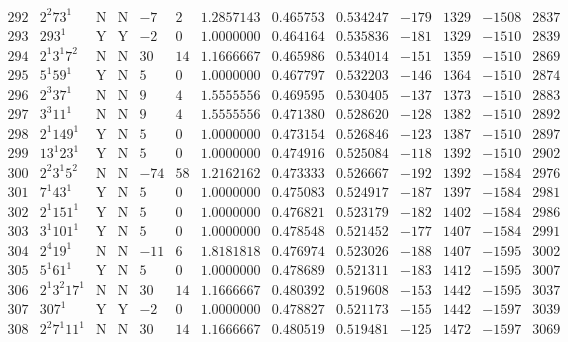 \documentclass[11pt,reqno,a4letter]{article}
\numberwithin{equation}{section}
\numberwithin{figure}{section}
\numberwithin{table}{section}
\theoremstyle{plain}
\numberwithin{theorem}{section}
\theoremstyle{definition}
\begin{document}
\begin{table}[ht]
\begin{equation*}
{\begin{array}{cc|cc|ccc|cc|cccc}
 292 & 2^2 73^1 & \text{N} & \text{N} & -7 & 2 & 1.2857143 & 0.465753 & 0.534247 & -179 & 1329 & -1508 & 2837 \\
 293 & 293^1 & \text{Y} & \text{Y} & -2 & 0 & 1.0000000 & 0.464164 & 0.535836 & -181 & 1329 & -1510 & 2839 \\
 294 & 2^1 3^1 7^2 & \text{N} & \text{N} & 30 & 14 & 1.1666667 & 0.465986 & 0.534014 & -151 & 1359 & -1510 & 2869 \\
 295 & 5^1 59^1 & \text{Y} & \text{N} & 5 & 0 & 1.0000000 & 0.467797 & 0.532203 & -146 & 1364 & -1510 & 2874 \\
 296 & 2^3 37^1 & \text{N} & \text{N} & 9 & 4 & 1.5555556 & 0.469595 & 0.530405 & -137 & 1373 & -1510 & 2883 \\
 297 & 3^3 11^1 & \text{N} & \text{N} & 9 & 4 & 1.5555556 & 0.471380 & 0.528620 & -128 & 1382 & -1510 & 2892 \\
 298 & 2^1 149^1 & \text{Y} & \text{N} & 5 & 0 & 1.0000000 & 0.473154 & 0.526846 & -123 & 1387 & -1510 & 2897 \\
 299 & 13^1 23^1 & \text{Y} & \text{N} & 5 & 0 & 1.0000000 & 0.474916 & 0.525084 & -118 & 1392 & -1510 & 2902 \\
 300 & 2^2 3^1 5^2 & \text{N} & \text{N} & -74 & 58 & 1.2162162 & 0.473333 & 0.526667 & -192 & 1392 & -1584 & 2976 \\
 301 & 7^1 43^1 & \text{Y} & \text{N} & 5 & 0 & 1.0000000 & 0.475083 & 0.524917 & -187 & 1397 & -1584 & 2981 \\
 302 & 2^1 151^1 & \text{Y} & \text{N} & 5 & 0 & 1.0000000 & 0.476821 & 0.523179 & -182 & 1402 & -1584 & 2986 \\
 303 & 3^1 101^1 & \text{Y} & \text{N} & 5 & 0 & 1.0000000 & 0.478548 & 0.521452 & -177 & 1407 & -1584 & 2991 \\
 304 & 2^4 19^1 & \text{N} & \text{N} & -11 & 6 & 1.8181818 & 0.476974 & 0.523026 & -188 & 1407 & -1595 & 3002 \\
 305 & 5^1 61^1 & \text{Y} & \text{N} & 5 & 0 & 1.0000000 & 0.478689 & 0.521311 & -183 & 1412 & -1595 & 3007 \\
 306 & 2^1 3^2 17^1 & \text{N} & \text{N} & 30 & 14 & 1.1666667 & 0.480392 & 0.519608 & -153 & 1442 & -1595 & 3037 \\
 307 & 307^1 & \text{Y} & \text{Y} & -2 & 0 & 1.0000000 & 0.478827 & 0.521173 & -155 & 1442 & -1597 & 3039 \\
 308 & 2^2 7^1 11^1 & \text{N} & \text{N} & 30 & 14 & 1.1666667 & 0.480519 & 0.519481 & -125 & 1472 & -1597 & 3069 \\

\end{array}}
\end{equation*}
\end{table}
\end{document}
